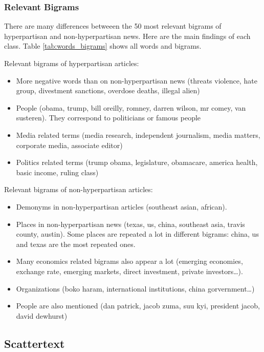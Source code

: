 \documentclass[11pt,a4paper]{article}
\begin{document}
\subsubsection{Relevant Bigrams}

There are many differences betweeen the 50 most relevant bigrams of
hyperpartisan and non-hyperpartisan news. Here are the main findings of each class. Table \ref{tab:words_bigrams} shows all words and bigrams.

Relevant bigrams of hyperpartisan articles:

\begin{itemize}
\item
  More negative words than on non-hyperpartisan news (threats violence,
  hate group, divestment sanctions, overdose deaths, illegal alien)
\item
  People (obama, trump, bill oreilly, romney, darren wilson, mr comey,
  van susteren). They correspond to politicians or famous people
\item
  Media related terms (media research, independent journalism, media
  matters, corporate media, associate editor)
\item
  Politics related terms (trump obama, legislature, obamacare, america
  health, basic income, ruling class)
\end{itemize}

Relevant bigrams of non-hyperpartisan articles:

\begin{itemize}
\item
  Demonyms in non-hyperpartisan articles (southeast asian, african).
\item
  Places in non-hyperpartisan news (texas, us, china, southeast asia,
  travis county, austin). Some places are repeated a lot in different
  bigrams: china, us and texas are the most repeated ones.
\item
  Many economics related bigrams also appear a lot (emerging economies,
  exchange rate, emerging markets, direct investment, private
  investors\ldots).
\item
  Organizations (boko haram, international institutions, china
  gorvernment\ldots)
\item
  People are also mentioned (dan patrick, jacob zuma, suu kyi, president
  jacob, david dewhurst)
\end{itemize}

\subsection{Scattertext}
\end{document}
